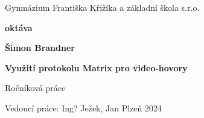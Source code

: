 \begin{center}
	\large{Gymnázium Františka Křižíka a základní škola s.r.o.}
	\vspace{1cm}

	\large{\textbf{oktáva}}
	\vspace{2cm}

	\large{\textbf{Šimon Brandner}}
	\vspace{3.5cm}

	\huge{\textbf{Využití protokolu Matrix pro video-hovory}}
	\vspace{3.5cm}

	\huge{Ročníková práce}
	\vspace{3.5cm}

	\large{Vedoucí práce: Ing? Ježek, Jan \hfill \large{Plzeň 2024}}

\end{center}
\thispagestyle{empty}
\newpage
